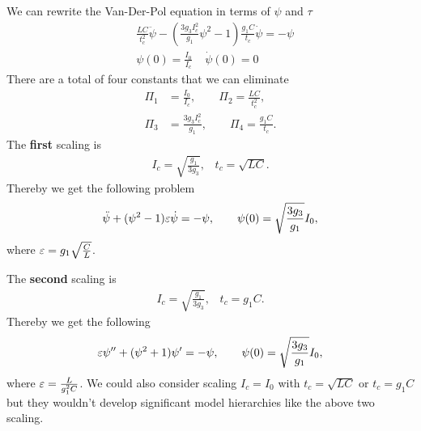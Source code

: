 We can rewrite the Van-Der-Pol equation in terms of $\psi$ and $\tau$
\begin{align}
    &\frac{LC}{t_c^2}\ddot{\psi} - \left(\frac{3g_3I_c^2}{g_1}\psi^2 -
    1\right)\frac{g_1C}{t_c}\dot{\psi}= -\psi\\
    &\psi(0) = \frac{I_0}{I_c} \;\;\;\; \dot{\psi}(0) = 0
\end{align}
There are a total of four constants that we can eliminate
\begin{align}
    \Pi_1 &= \frac{I_0}{I_c}, \qquad
    \Pi_2 = \frac{LC}{t_c^2},\nonumber\\
    \Pi_3 &= \frac{3g_3I_c^2}{g_1}, \qquad
    \Pi_4 = \frac{g_1C}{t_c}.
\end{align}
The \textbf{first} scaling is
\begin{align}
    I_c = \sqrt{\frac{g_1}{3g_3}},\;\;\; t_c=\sqrt{LC}.
\end{align}
Thereby we get the following problem
\begin{align}
    \ddot{\psi} + (\psi^2 - 1)\varepsilon \dot{\psi} = -\psi, \qquad \psi(0) =
    \sqrt{\frac{3g_3}{g_1}}I_0,
\end{align}
where $\varepsilon = g_1\sqrt{\frac{C}{L}}$.

The \textbf{second} scaling is
\begin{align}
    I_c = \sqrt{\frac{g_1}{3g_3}},\;\;\; t_c=g_1C.
\end{align}
Thereby we get the following
\begin{align}
    \varepsilon \psi'' +(\psi^2 +1)\psi' = -\psi, \qquad \psi(0) =
    \sqrt{\frac{3g_3}{g_1}}I_0,
\end{align}
where $\varepsilon = \frac{L}{g_1^2C}$. We could also consider scaling $I_c = I_0$
with $t_c = \sqrt{LC}$ or $t_c = g_1C$ but they wouldn't develop significant
model hierarchies like the above two scaling.
